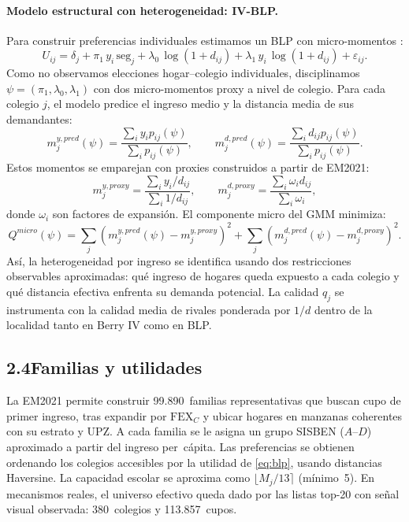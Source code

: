 \documentclass[12pt,a4paper]{article}
\begin{document}
\paragraph{Modelo estructural con heterogeneidad: IV-BLP.}
Para construir preferencias individuales estimamos un BLP con micro-momentos
\citep{Berry1994,ConlonGortmaker2020}:
\begin{equation}
U_{ij} = \delta_j + \pi_1\, y_i\, \text{seg}_j
  + \lambda_0\,\log(1{+}d_{ij}) + \lambda_1\, y_i\,\log(1{+}d_{ij})
  + \varepsilon_{ij}.
\label{eq:blp}
\end{equation}
Como no observamos elecciones hogar--colegio individuales, disciplinamos
$\psi=(\pi_1,\lambda_0,\lambda_1)$ con dos micro-momentos proxy a nivel de
colegio. Para cada colegio $j$, el modelo predice el ingreso medio y la
distancia media de sus demandantes:
\begin{equation}
m^{y,pred}_j(\psi)=
\frac{\sum_i y_i p_{ij}(\psi)}{\sum_i p_{ij}(\psi)},
\qquad
m^{d,pred}_j(\psi)=
\frac{\sum_i d_{ij}p_{ij}(\psi)}{\sum_i p_{ij}(\psi)}.
\label{eq:micro_pred}
\end{equation}
Estos momentos se emparejan con proxies construidos a partir de EM2021:
\[
m^{y,proxy}_j=\frac{\sum_i y_i/d_{ij}}{\sum_i 1/d_{ij}},
\qquad
m^{d,proxy}_j=\frac{\sum_i \omega_i d_{ij}}{\sum_i \omega_i},
\]
donde $\omega_i$ son factores de expansión. El componente micro del GMM minimiza:
\begin{equation}
Q^{micro}(\psi)=
\sum_j
\left(m^{y,pred}_j(\psi)-m^{y,proxy}_j\right)^2
+
\sum_j
\left(m^{d,pred}_j(\psi)-m^{d,proxy}_j\right)^2.
\label{eq:micro_obj}
\end{equation}
Así, la heterogeneidad por ingreso se identifica usando dos restricciones
observables aproximadas: qué ingreso de hogares queda expuesto a cada colegio y
qué distancia efectiva enfrenta su demanda potencial.
La calidad $q_j$ se instrumenta con la calidad media de rivales ponderada por
$1/d$ dentro de la localidad tanto en Berry IV como en BLP.

\subsection*{2.4\quad Familias y utilidades}

La EM2021 permite construir 99{.}890~familias representativas que buscan cupo de
primer ingreso, tras expandir por $\text{FEX}_C$ y ubicar hogares en manzanas
coherentes con su estrato y UPZ. A cada familia se le asigna un grupo SISBEN
($A$--$D$) aproximado a partir del ingreso per~cápita. Las preferencias se
obtienen ordenando los colegios accesibles por la utilidad de
\eqref{eq:blp}, usando distancias Haversine. La capacidad escolar se aproxima
como $\lfloor M_j/13\rceil$ (mínimo~5). En mecanismos reales, el universo efectivo
queda dado por las listas top-20 con señal visual observada: 380~colegios y
113{.}857~cupos.
\end{document}
